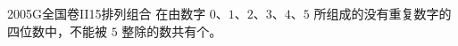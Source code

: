 
\begin{problem}{2005}{G}{全国卷II}{15}{排列组合}
在由数字 $ 0 $、$ 1 $、$ 2 $、$ 3 $、$ 4 $、$ 5 $ 所组成的没有重复数字的四位数中，不能被 $ 5 $ 整除的数共有\underline{\hspace{4em}}个。
\end{problem}

\begin{answer}

\end{answer}

\begin{solutions}

\end{solutions}